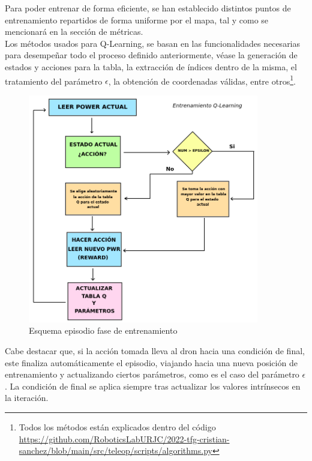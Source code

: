 Para poder entrenar de forma eficiente, se han establecido distintos puntos de entrenamiento repartidos de forma uniforme por el mapa, tal y como se mencionará en la sección de métricas.\\

Los métodos usados para Q-Learning, se basan en las funcionalidades necesarias para desempeñar todo el proceso definido anteriormente, véase la generación de estados y acciones para la tabla, la extracción de índices dentro de la misma, el tratamiento del parámetro $\epsilon$, la obtención de coordenadas válidas, entre otros\footnote[3]{Todos los métodos están explicados dentro del código \url{https://github.com/RoboticsLabURJC/2022-tfg-cristian-sanchez/blob/main/src/teleop/scripts/algorithms.py}}.\\

\begin{figure} [H]
    \begin{center}
    \includegraphics[height=10cm]{imagenes/cap4/11_diagrama_training.png}
    \end{center}
    \caption[Esquema episodio fase de entrenamiento]{Esquema episodio fase de entrenamiento}
    \label{fig:training_phase}
\end{figure}

Cabe destacar que, si la acción tomada lleva al dron hacia una condición de final, este finaliza automáticamente el episodio, viajando hacia una nueva posición de entrenamiento y actualizando ciertos parámetros, como es el caso  del parámetro $\epsilon$. La condición de final se aplica siempre tras actualizar los valores intrínsecos en la iteración.\\

